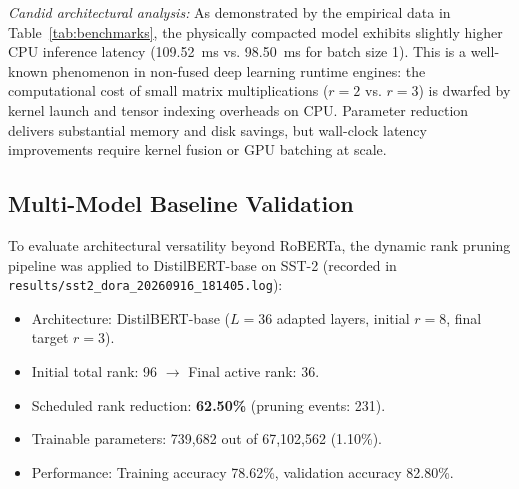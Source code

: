 \documentclass[conference]{IEEEtran}
\begin{document}
\begin{table}[t]
  \centering
  \caption{CPU inference latency and throughput benchmark results}
  \label{tab:benchmarks}
\end{table}

\textit{Candid architectural analysis:} As demonstrated by the empirical data in Table~\ref{tab:benchmarks}, the physically compacted model exhibits slightly higher CPU inference latency (109.52~ms vs. 98.50~ms for batch size 1). This is a well-known phenomenon in non-fused deep learning runtime engines: the computational cost of small matrix multiplications ($r=2$ vs. $r=3$) is dwarfed by kernel launch and tensor indexing overheads on CPU. Parameter reduction delivers substantial memory and disk savings, but wall-clock latency improvements require kernel fusion or GPU batching at scale.

\subsection{Multi-Model Baseline Validation}
To evaluate architectural versatility beyond RoBERTa, the dynamic rank pruning pipeline was applied to DistilBERT-base on SST-2 (recorded in \texttt{results/sst2\_dora\_20260916\_181405.log}):
\begin{itemize}
  \item Architecture: DistilBERT-base ($L = 36$ adapted layers, initial $r=8$, final target $r=3$).
  \item Initial total rank: 96 $\rightarrow$ Final active rank: 36.
  \item Scheduled rank reduction: \textbf{62.50\%} (pruning events: 231).
  \item Trainable parameters: 739,682 out of 67,102,562 (1.10\%).
  \item Performance: Training accuracy 78.62\%, validation accuracy 82.80\%.
\end{itemize}
\end{document}

